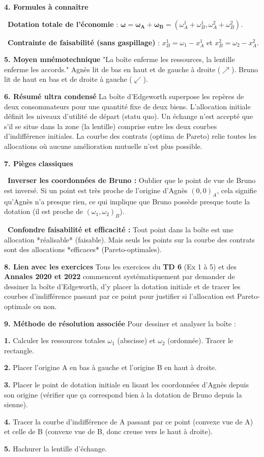 \documentclass[11pt, a4paper]{report}
\begin{document}
\textbf{4. Formules à connaître}
\par \textbullet\ \textbf{Dotation totale de l'économie} : $\mathbf{\omega} = \mathbf{\omega_A} + \mathbf{\omega_B} = (\omega_A^1 + \omega_B^1, \omega_A^2 + \omega_B^2)$.
\par \textbullet\ \textbf{Contrainte de faisabilité (sans gaspillage)} : $x_B^1 = \omega_1 - x_A^1$ et $x_B^2 = \omega_2 - x_A^2$. 

\textbf{5. Moyen mnémotechnique}
"La boîte enferme les ressources, la lentille enferme les accords."
Agnès lit de bas en haut et de gauche à droite ($\nearrow$). Bruno lit de haut en bas et de droite à gauche ($\swarrow$).

\textbf{6. Résumé ultra condensé}
La boîte d'Edgeworth superpose les repères de deux consommateurs pour une quantité fixe de deux biens. L'allocation initiale définit les niveaux d'utilité de départ (statu quo). Un échange n'est accepté que s'il se situe dans la zone (la lentille) comprise entre les deux courbes d'indifférence initiales. La courbe des contrats (optima de Pareto) relie toutes les allocations où aucune amélioration mutuelle n'est plus possible.

\textbf{7. Pièges classiques}
\par \textbullet\ \textbf{Inverser les coordonnées de Bruno :} Oublier que le point de vue de Bruno est inversé. Si un point est très proche de l'origine d'Agnès $(0,0)_A$, cela signifie qu'Agnès n'a presque rien, ce qui implique que Bruno possède presque toute la dotation (il est proche de $(\omega_1, \omega_2)_B$).
\par \textbullet\ \textbf{Confondre faisabilité et efficacité :} Tout point dans la boîte est une allocation *réalisable* (faisable). Mais seuls les points sur la courbe des contrats sont des allocations *efficaces* (Pareto-optimales).

\textbf{8. Lien avec les exercices}
Tous les exercices du \textbf{TD 6} (Ex 1 à 5) et des \textbf{Annales 2020 et 2022} commencent systématiquement par demander de dessiner la boîte d'Edgeworth, d'y placer la dotation initiale et de tracer les courbes d'indifférence passant par ce point pour justifier si l'allocation est Pareto-optimale ou non.

\textbf{9. Méthode de résolution associée}
Pour dessiner et analyser la boîte :
\par \textbf{1.} Calculer les ressources totales $\omega_1$ (abscisse) et $\omega_2$ (ordonnée). Tracer le rectangle.
\par \textbf{2.} Placer l'origine A en bas à gauche et l'origine B en haut à droite.
\par \textbf{3.} Placer le point de dotation initiale en lisant les coordonnées d'Agnès depuis son origine (vérifier que ça correspond bien à la dotation de Bruno depuis la sienne).
\par \textbf{4.} Tracer la courbe d'indifférence de A passant par ce point (convexe vue de A) et celle de B (convexe vue de B, donc creuse vers le haut à droite).
\par \textbf{5.} Hachurer la lentille d'échange.
\end{document}

